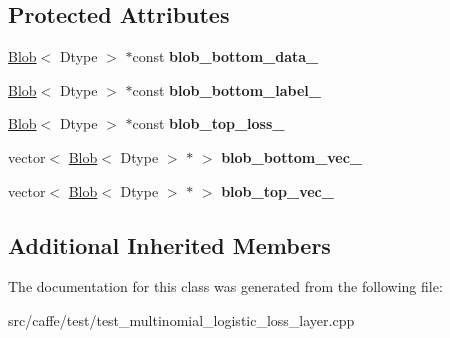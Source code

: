 \subsection*{Protected Attributes}
\begin{DoxyCompactItemize}
\item 
\mbox{\label{classcaffe_1_1_multinomial_logistic_loss_layer_test_a3ff6abb2618f4ea1257e3f423e2d1bef}} 
\mbox{\hyperlink{classcaffe_1_1_blob}{Blob}}$<$ Dtype $>$ $\ast$const {\bfseries blob\+\_\+bottom\+\_\+data\+\_\+}
\item 
\mbox{\label{classcaffe_1_1_multinomial_logistic_loss_layer_test_a8d187356bce9457509a461e4aad1ea0b}} 
\mbox{\hyperlink{classcaffe_1_1_blob}{Blob}}$<$ Dtype $>$ $\ast$const {\bfseries blob\+\_\+bottom\+\_\+label\+\_\+}
\item 
\mbox{\label{classcaffe_1_1_multinomial_logistic_loss_layer_test_ad15959241a69694f00bd7dff59aa80b2}} 
\mbox{\hyperlink{classcaffe_1_1_blob}{Blob}}$<$ Dtype $>$ $\ast$const {\bfseries blob\+\_\+top\+\_\+loss\+\_\+}
\item 
\mbox{\label{classcaffe_1_1_multinomial_logistic_loss_layer_test_a1e54a2b39c6607f7addf35509af7ff1f}} 
vector$<$ \mbox{\hyperlink{classcaffe_1_1_blob}{Blob}}$<$ Dtype $>$ $\ast$ $>$ {\bfseries blob\+\_\+bottom\+\_\+vec\+\_\+}
\item 
\mbox{\label{classcaffe_1_1_multinomial_logistic_loss_layer_test_a4783a4aa643582e0d8ee36eb9fc44889}} 
vector$<$ \mbox{\hyperlink{classcaffe_1_1_blob}{Blob}}$<$ Dtype $>$ $\ast$ $>$ {\bfseries blob\+\_\+top\+\_\+vec\+\_\+}
\end{DoxyCompactItemize}
\subsection*{Additional Inherited Members}


The documentation for this class was generated from the following file\+:\begin{DoxyCompactItemize}
\item 
src/caffe/test/test\+\_\+multinomial\+\_\+logistic\+\_\+loss\+\_\+layer.\+cpp\end{DoxyCompactItemize}
